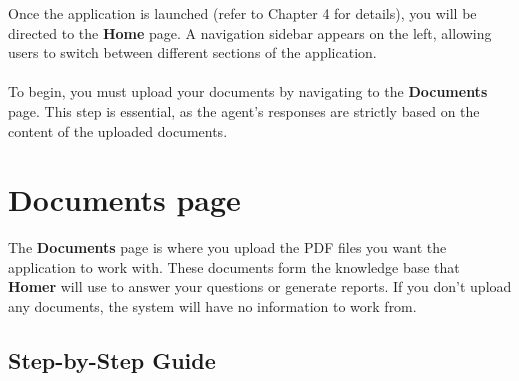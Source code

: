 \documentclass[11pt,a4paper]{report}
\begin{document}
Once the application is launched (refer to Chapter 4 for details), you will be directed to the \textbf{Home} page. A navigation sidebar appears on the left, allowing users to switch between different sections of the application.
\\
\\
To begin, you must upload your documents by navigating to the \textbf{Documents} page. This step is essential, as the agent's responses are strictly based on the content of the uploaded documents.

\section{Documents page}

The \textbf{Documents} page is where you upload the PDF files you want the application to work with. These documents form the knowledge base that \textbf{Homer} will use to answer your questions or generate reports. If you don't upload any documents, the system will have no information to work from.


\subsection*{Step-by-Step Guide}
\end{document}
